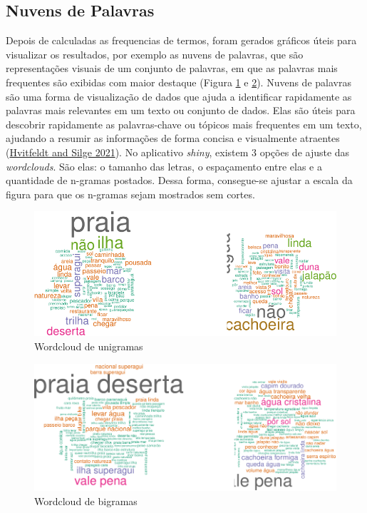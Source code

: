 \documentclass[preprint, 3p,
authoryear]{elsarticle} %
\begin{document}
\hypertarget{nuvens-de-palavras}{%
\subsection{Nuvens de Palavras}\label{nuvens-de-palavras}}

Depois de calculadas as frequencias de termos, foram gerados gráficos
úteis para visualizar os resultados, por exemplo as nuvens de palavras,
que são representações visuais de um conjunto de palavras, em que as
palavras mais frequentes são exibidas com maior destaque (Figura
\ref{fig:fig2} e \ref{fig:fig3}). Nuvens de palavras são uma forma de
visualização de dados que ajuda a identificar rapidamente as palavras
mais relevantes em um texto ou conjunto de dados. Elas são úteis para
descobrir rapidamente as palavras-chave ou tópicos mais frequentes em um
texto, ajudando a resumir as informações de forma concisa e visualmente
atraentes (\protect\hyperlink{ref-Hvitfeldt2021}{Hvitfeldt and Silge
2021}). No aplicativo \emph{shiny}, existem 3 opções de ajuste das
\emph{wordclouds}. São elas: o tamanho das letras, o espaçamento entre
elas e a quantidade de n-gramas postados. Dessa forma, consegue-se
ajustar a escala da figura para que os n-gramas sejam mostrados sem
cortes.

\begin{figure}[H]

{\centering \includegraphics{bookdown-artigo_files/figure-latex/fig2-1} 

}

\caption{Wordcloud de unigramas}\label{fig:fig2}
\end{figure}

\begin{figure}[H]

{\centering \includegraphics{bookdown-artigo_files/figure-latex/fig3-1} 

}

\caption{Wordcloud de bigramas}\label{fig:fig3}
\end{figure}
\end{document}
